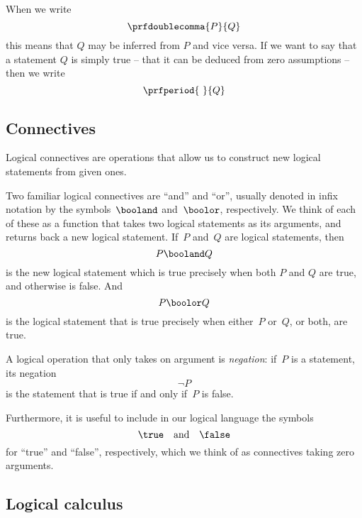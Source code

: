 When we write
\begin{equation*}
    \prfdoublecomma{
        P
    }{
        Q
    }
\end{equation*}
this means that $Q$ may be inferred from $P$ and vice versa.
If we want to say that a statement $Q$ is simply true -- that it can be deduced from zero assumptions -- then we write
\begin{equation*}
    \prfperiod{
        \
    }{
        Q
    }
\end{equation*}

\subsection{Connectives}

Logical connectives are operations that allow us to construct new logical statements from given ones.

Two familiar logical connectives are ``and'' and ``or'', usually denoted in infix notation by the symbols~$\booland$ and~$\boolor$, respectively.
We think of each of these as a function that takes two logical statements as its arguments, and returns back a new logical statement.
If~$P$ and~$Q$ are logical statements, then~
\begin{equation*}
    P \booland Q
\end{equation*}
is the new logical statement which is true precisely when both $P$ and $Q$ are true, and otherwise is false.
And
\begin{equation*}
    P \boolor Q
\end{equation*}
is the logical statement that is true precisely when either~$P$ or~$Q$, or both, are true.

A logical operation that only takes on argument is \emph{negation}: if~$P$ is a statement, its negation
\begin{equation*}
    \lnot P
\end{equation*}
is the statement that is true if and only if~$P$ is false.

Furthermore, it is useful to include in our logical language the symbols~
\begin{equation}
    \true \quad \text{and}  \quad \false
\end{equation}
for ``true'' and ``false'', respectively, which we think of as connectives taking zero arguments.

\subsection{Logical calculus}

